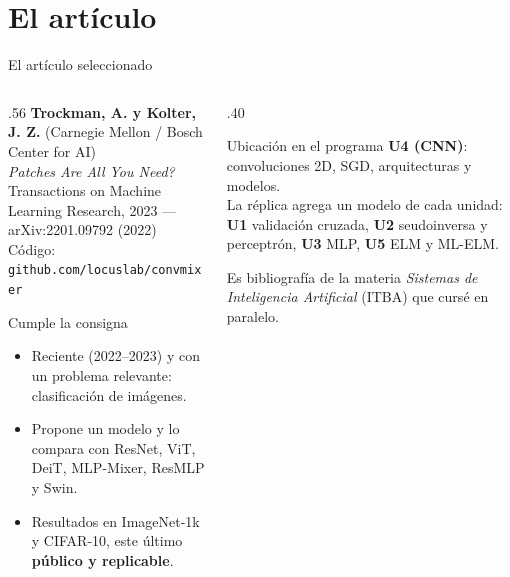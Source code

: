 \documentclass[aspectratio=169,xcolor=table]{beamer}
\begin{document}
\section{El artículo}
\begin{frame}{El artículo seleccionado}
  \begin{columns}[T]
    \begin{column}{.56\textwidth}
      \textbf{Trockman, A. y Kolter, J. Z.} (Carnegie Mellon / Bosch Center for AI)\\
      \emph{Patches Are All You Need?}\\
      Transactions on Machine Learning Research, 2023 --- arXiv:2201.09792 (2022)\\
      Código: \texttt{github.com/locuslab/convmixer}
      \vspace{6pt}
      \begin{block}{Cumple la consigna}
        \small
        \begin{itemize}
          \item Reciente (2022--2023) y con un problema relevante: clasificación de imágenes.
          \item Propone un modelo y lo compara con ResNet, ViT, DeiT, MLP-Mixer, ResMLP y Swin.
          \item Resultados en ImageNet-1k y CIFAR-10, este último \textbf{público y replicable}.
        \end{itemize}
      \end{block}
    \end{column}
    \begin{column}{.40\textwidth}
      \begin{block}{Ubicación en el programa}
        \small
        \textbf{U4 (CNN)}: convoluciones 2D, SGD, arquitecturas y modelos.\\[3pt]
        La réplica agrega un modelo de cada unidad: \textbf{U1} validación cruzada, \textbf{U2} seudoinversa
        y perceptrón, \textbf{U3} MLP, \textbf{U5} ELM y ML-ELM.
      \end{block}
      \vspace{3pt}
      {\footnotesize Es bibliografía de la materia \emph{Sistemas de Inteligencia Artificial} (ITBA) que cursé
      en paralelo.}
    \end{column}
  \end{columns}
\end{frame}

\end{document}
